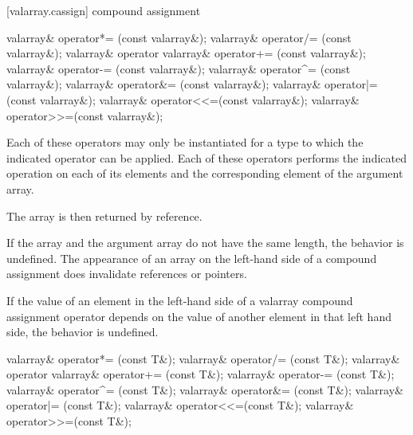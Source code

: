 [valarray.cassign]{ compound assignment}

%
%
%
%
%
%
%
%
%
%
\begin{itemdecl}
valarray& operator*= (const valarray&);
valarray& operator/= (const valarray&);
valarray& operator%
valarray& operator+= (const valarray&);
valarray& operator-= (const valarray&);
valarray& operator^= (const valarray&);
valarray& operator&= (const valarray&);
valarray& operator|= (const valarray&);
valarray& operator<<=(const valarray&);
valarray& operator>>=(const valarray&);
\end{itemdecl}

\begin{itemdescr}
\pnum
Each of these operators may only be instantiated for a type 
to which the indicated operator can be applied.
Each of these operators
performs the indicated operation on each of its elements and the
corresponding element of the argument array.

\pnum
The array is then returned by reference.

\pnum
If the array and the
argument array do not have the same length, the behavior is undefined.%
The appearance of an array on the left-hand side of a compound assignment
does  invalidate references or pointers.

\pnum
If the value of an element in the left-hand side of a valarray compound
assignment operator depends on the value of another element in that left
hand side, the behavior is undefined.
\end{itemdescr}

%
%
%
%
%
%
%
%
%
%
\begin{itemdecl}
valarray& operator*= (const T&);
valarray& operator/= (const T&);
valarray& operator%
valarray& operator+= (const T&);
valarray& operator-= (const T&);
valarray& operator^= (const T&);
valarray& operator&= (const T&);
valarray& operator|= (const T&);
valarray& operator<<=(const T&);
valarray& operator>>=(const T&);
\end{itemdecl}

